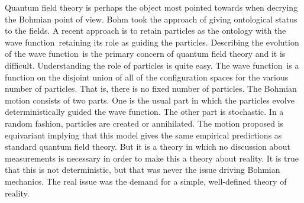 \documentclass[11pt]{article}
\theoremstyle{remark}
\begin{document}
Quantum field theory is perhaps the object most pointed towards when
decrying the Bohmian point of view. Bohm took the approach of giving
ontological status to the fields. A recent approach \cite{DGTuZ02} is to retain
particles as the ontology with the wave function\ retaining its role as guiding
the particles. Describing the evolution of the wave function\ is the primary
concern of quantum field theory and it is difficult.  Understanding
the role of particles is quite easy. The wave function\ is a function on the
disjoint union of all of the configuration spaces for the various
number of particles. That is, there is no fixed number of
particles. The Bohmian motion consists of two parts. One is the usual
part in which the particles evolve deterministically guided 
the wave function. 
The other part is stochastic. In a random fashion, particles
are created or annihilated. The motion
proposed is equivariant implying that this model
gives the same empirical 
predictions as standard quantum field theory. But it is
a theory in which no discussion about measurements is necessary in
order to make this a theory about reality. It is true that this is not
deterministic, but that was never the issue driving Bohmian
mechanics. The real issue was the demand for a simple,
well-defined theory of reality.

\clearpage


\end{document}
